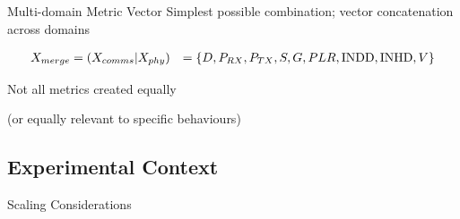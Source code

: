 \documentclass[aspectratio=169]{beamer}
\let\\\space
\begin{document}
\begin{frame}{Multi-domain Metric Vector}
  Simplest possible combination; vector concatenation across domains 

  \begin{align}
    \centering
    X_{merge} &=  (X_{comms}|X_{phy}) \nonumber\\
    &= \{D, P_{RX}, P_{TX}, S, G, PLR, \text{INDD}, \text{INHD}, V\}
    \label{eq:merge:vector}
  \end{align}

  \pause 

  \alert{Not all metrics created equally}

  (or equally relevant to specific behaviours)
\end{frame}



\subsection{Experimental Context}

\begin{frame}{Scaling Considerations}
  \begin{figure}[h]
    \centering
    \\
    \label{fig:CommsThroughputRatios}
  \end{figure}


\end{frame}
\end{document}
